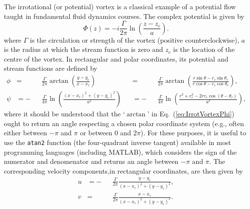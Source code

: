 \documentclass[10pt, twoside]{book}
\begin{document}
			The irrotational (or potential) vortex is a classical example of a potential flow taught in fundamental fluid dynamics courses. The complex potential is given by
			\begin{equation}
				\label{eq:IrrotVortexPHI}
				\Phi\left(z\right) = -i\frac{\Gamma}{2\pi}\ln\left(\frac{z - z_c}{a}\right).
			\end{equation}
			where $\Gamma$ is the circulation or strength of the vortex (positive counterclockwise), $a$ is the radius at which the stream function is zero and $z_c$ is the location of the centre of the vortex. In rectangular and polar coordinates, its potential and stream functions are defined by
			\begin{subequations}
			\label{eq:IrrotVortexPhiPsi}
				\begin{alignat}{4}
					\phi &= &&\frac{\Gamma}{2\pi}\arctan\left(\frac{y - y_c}{x - x_c}\right) &&= &&\frac{\Gamma}{2\pi}\arctan\left(\frac{r\sin\theta - r_c\sin\theta_c}{r\cos\theta - r_c\cos\theta_c}\right),\label{eq:IrrotVortexPhi}\\
					\psi &= -&&\frac{\Gamma}{4\pi}\ln\left(\frac{\left(x - x_c\right)^2 + \left(y - y_c\right)^2}{a^2}\right) &&= -&&\frac{\Gamma}{4\pi}\ln\left(\frac{r^2 + r_c^2 - 2rr_c\cos\left(\theta - \theta_c\right)}{a^2}\right),\label{eq:IrrotVortexPsi}
				\end{alignat}
			\end{subequations}
			where it should be understood that the `$\arctan$' in Eq.~(\ref{eq:IrrotVortexPhi}) ought to return an angle respecting a chosen polar coordinate system (e.g., often either between $-\pi$ and $\pi$ or between $0$ and $2\pi$). For these purposes, it is useful to use the \texttt{atan2} function (the four-quadrant inverse tangent) available in most programming languages (including MATLAB), which considers the sign of the numerator and denomenator and returns an angle between $-\pi$ and $\pi$. The corresponding velocity components,in rectangular coordinates, are then given by
			\begin{subequations}
				\label{eq:IrrotVortexVel}
				\begin{alignat}{2}
					u &= -&&\frac{\Gamma}{2\pi}\frac{y - y_c}{\left(x - x_c\right)^2 + \left(y - y_c\right)^2},\label{eq:IrrotVortexVelU}\\
					v &=  &&\frac{\Gamma}{2\pi}\frac{x - x_c}{\left(x - x_c\right)^2 + \left(y - y_c\right)^2}.\label{eq:IrrotVortexVelV}
				\end{alignat}
			\end{subequations}
\end{document}
